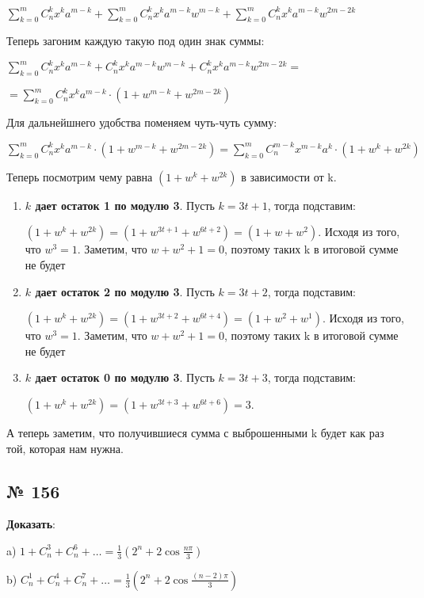 \documentclass{article}
\begin{document}
$\sum\limits_{k=0}^m C_n^k x^k a^{m-k} + \sum\limits_{k=0}^m C_n^k x^k a^{m-k}w^{m-k} + \sum\limits_{k=0}^m C_n^k x^k a^{m-k}w^{2m-2k}$

Теперь загоним каждую такую под  один знак суммы:

$\sum\limits_{k=0}^m C_n^k x^k a^{m-k}+C_n^k x^k a^{m-k}w^{m-k}+C_n^k x^k a^{m-k}w^{2m-2k} = $

$= \sum\limits_{k=0}^m C_n^k x^k a^{m-k} \cdot (1 + w^{m-k} + w^{2m-2k})$

Для дальнейшнего удобства поменяем чуть-чуть сумму:

$\sum\limits_{k=0}^m C_n^k x^k a^{m-k} \cdot (1 + w^{m-k} + w^{2m-2k}) = \sum\limits_{k=0}^m C_n^{m-k} x^{m-k} a^{k} \cdot (1 + w^{k} + w^{2k})$

Теперь посмотрим  чему равна $(1 + w^{k} + w^{2k})$ в зависимости от k. 

\begin{enumerate}
    \item \textbf{$k$ дает остаток 1 по модулю 3}. Пусть $k=3t+1$, тогда подставим:

     $(1 + w^{k} + w^{2k}) =  (1 + w^{3t+1} + w^{6t+2}) =(1+w+w^2)$. Исходя из того, что $w^3=1$.
     Заметим, что $w+w^2+1=0$, поэтому таких k  в итоговой сумме не будет

     \item \textbf{$k$ дает остаток 2 по модулю 3}. Пусть $k=3t+2$, тогда подставим:

     $(1 + w^{k} + w^{2k}) =  (1 + w^{3t+2} + w^{6t+4}) =(1+w^2+w^1)$. Исходя из того, что $w^3=1$.
     Заметим, что $w+w^2+1=0$, поэтому таких k  в итоговой сумме не будет

    \item \textbf{$k$ дает остаток 0 по модулю 3}. Пусть $k=3t+3$, тогда подставим:

     $(1 + w^{k} + w^{2k}) =  (1 + w^{3t+3} + w^{6t+6}) =3$.
\end{enumerate}

А теперь заметим, что получившиеся сумма с выброшенными k будет как раз той, которая нам нужна.

\pagebreak
\subsection{№ 156}

\textbf{Доказать}:

a) $1 + C_n^3 + C_n^6 + \ldots = \frac{1}{3}(2^{n}+2\cos\frac{n \pi}{3} )$

b) $C_n^1 + C_n^4 + C_n^7 + \ldots =\frac{1}{3}(2^{n}+2\cos\frac{(n-2) \pi}{3} ) $
\end{document}
